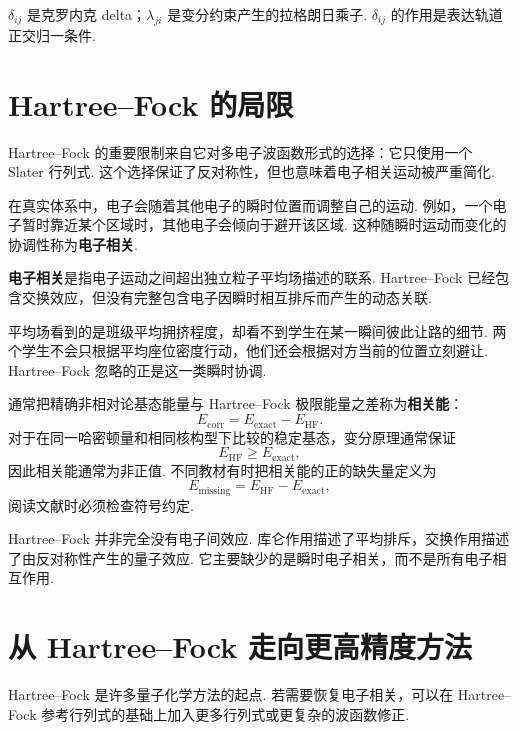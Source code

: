 \documentclass[UTF8,11pt,a4paper,openany]{ctexbook}
\newcommand{\term}[1]{\textbf{#1}}
\begin{document}
\begin{notationbox}
$\delta_{ij}$ 是克罗内克 delta；$\lambda_{ji}$ 是变分约束产生的拉格朗日乘子. $\delta_{ij}$ 的作用是表达轨道正交归一条件. 
\end{notationbox}

\section{Hartree--Fock 的局限}

Hartree--Fock 的重要限制来自它对多电子波函数形式的选择：它只使用一个 Slater 行列式. 这个选择保证了反对称性，但也意味着电子相关运动被严重简化. 

在真实体系中，电子会随着其他电子的瞬时位置而调整自己的运动. 例如，一个电子暂时靠近某个区域时，其他电子会倾向于避开该区域. 这种随瞬时运动而变化的协调性称为\term{电子相关}. 

\begin{definitionbox}
\term{电子相关}是指电子运动之间超出独立粒子平均场描述的联系. Hartree--Fock 已经包含交换效应，但没有完整包含电子因瞬时相互排斥而产生的动态关联. 
\end{definitionbox}

\begin{analogybox}
平均场看到的是班级平均拥挤程度，却看不到学生在某一瞬间彼此让路的细节. 两个学生不会只根据平均座位密度行动，他们还会根据对方当前的位置立刻避让. Hartree--Fock 忽略的正是这一类瞬时协调. 
\end{analogybox}

通常把精确非相对论基态能量与 Hartree--Fock 极限能量之差称为\term{相关能}：
\[
E_{\mathrm{corr}}
=
E_{\mathrm{exact}}-E_{\mathrm{HF}}.
\]
对于在同一哈密顿量和相同核构型下比较的稳定基态，变分原理通常保证
\[
E_{\mathrm{HF}}\geq E_{\mathrm{exact}},
\]
因此相关能通常为非正值. 不同教材有时把相关能的正的缺失量定义为
\[
E_{\mathrm{missing}}
=
E_{\mathrm{HF}}-E_{\mathrm{exact}},
\]
阅读文献时必须检查符号约定. 

\begin{limitbox}
Hartree--Fock 并非完全没有电子间效应. 库仑作用描述了平均排斥，交换作用描述了由反对称性产生的量子效应. 它主要缺少的是瞬时电子相关，而不是所有电子相互作用. 
\end{limitbox}

\section{从 Hartree--Fock 走向更高精度方法}

Hartree--Fock 是许多量子化学方法的起点. 若需要恢复电子相关，可以在 Hartree--Fock 参考行列式的基础上加入更多行列式或更复杂的波函数修正. 
\end{document}
